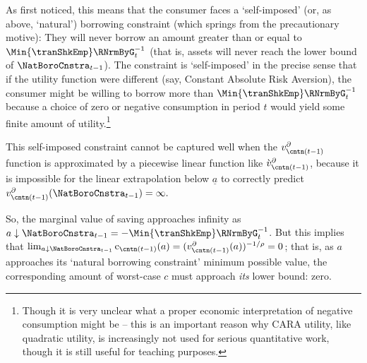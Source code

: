 \documentclass[titlepage, headings=optiontotocandhead]{econark}
\begin{document}
{As \cite{zeldesStochastic} first noticed, this means that the consumer faces a `self-imposed' (or, as above, `natural') borrowing constraint (which springs from the precautionary motive): They will never borrow an amount greater than or equal to $\Min{\tranShkEmp}\RNrmByG_{t}^{-1}$ (that is, assets will never reach the lower bound of $\NatBoroCnstra_{t-1}$).  The constraint is `self-imposed' in the precise sense that if the utility function were different (say, Constant Absolute Risk Aversion), the consumer might be willing to borrow more than $\Min{\tranShkEmp}\RNrmByG_{t}^{-1}$ because a choice of zero or negative consumption in period $t$ would yield some finite amount of utility.\footnote{Though it is very unclear what a proper economic interpretation of negative consumption might be -- this is an important reason why CARA utility, like quadratic utility, is increasingly not used for serious quantitative work, though it is still useful for teaching purposes.}

This self-imposed constraint cannot be captured well when the $v^{\partial}_{{\cntn}(t-1)}$ function is approximated by a piecewise linear function like $\grave{v}^{\partial}_{{\cntn}(t-1)}$, because it is impossible for the linear extrapolation below ${\underline{a}}$ to correctly predict $v^{\partial}_{{\cntn}(t-1)}(\NatBoroCnstra_{t-1})=\infty.$ %


So, the marginal value of saving approaches infinity as $a \downarrow \NatBoroCnstra_{t-1}=-\Min{\tranShkEmp}\RNrmByG_{t}^{-1}$.  But this implies that $\lim_{a \downarrow \NatBoroCnstra_{t-1}} \mathrm{c}_{{\cntn}(t-1)}(a) = (v^{\partial}_{{\cntn}(t-1)}(a))^{-1/\rho} = 0$; that is, as $a$ approaches its `natural borrowing constraint' minimum possible value, the corresponding amount of worst-case $c$ must approach \textit{its} lower bound: zero.

}
\end{document}

